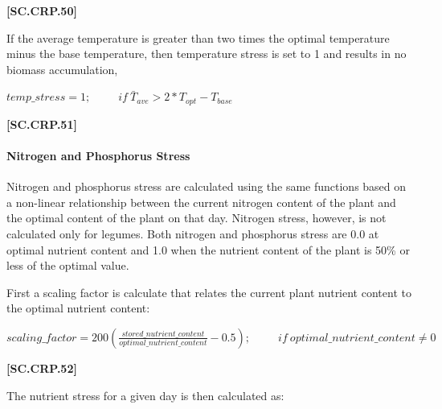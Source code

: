             {\raggedleft \textbf{[SC.CRP.50]}\par}
            \vspace{0.5cm}

If the average temperature is greater than two times the optimal temperature minus the base temperature, then temperature stress is set to 1 and results in no biomass accumulation, 
   \vspace{0.2cm}

    \begin{center}
        \(temp\_stress=1;\ \ \ \ \ \ \ \ \ \ \ if\  \bar{T}_{ave} > 2 * T_{opt} - T_{base}\) 
    \end{center}
        \vspace{0.5cm}
    
            {\raggedleft \textbf{[SC.CRP.51]}\par}
            \vspace{0.5cm}

\paragraph{Nitrogen and Phosphorus Stress}
\vspace{-0.25cm}

Nitrogen and phosphorus stress are calculated using the same functions based on a non-linear relationship between the current nitrogen content of the plant and the optimal content of the plant on that day. Nitrogen stress, however, is not calculated only for legumes. Both nitrogen and phosphorus stress are 0.0 at optimal nutrient content and 1.0 when the nutrient content of the plant is 50\% or less of the optimal value. 

First a scaling factor is calculate that relates the current plant nutrient content to the optimal nutrient content:
   \vspace{0.2cm}

    \begin{center}
        \(scaling\_factor=200(\frac{stored\_nutrient\_content}{optimal\_nutrient\_content} -0.5);\ \ \ \ \ \ \ \ \ \ \ if\  optimal\_nutrient\_content \neq 0\) 
    \end{center}
        \vspace{0.5cm}
    
            {\raggedleft \textbf{[SC.CRP.52]}\par}
            \vspace{0.5cm}

The nutrient stress for a given day is then calculated as:
   \vspace{0.2cm}


